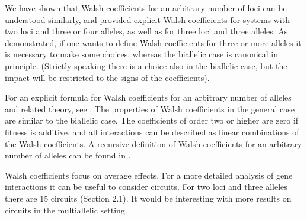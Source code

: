 \documentclass[12pt]{amsart}
\theoremstyle{plain}
\theoremstyle{definition}
\begin{document}
We have shown that Walsh-coefficients for an arbitrary number of loci
can be understood similarly, and provided explicit Walsh coefficients
for systems with two loci and three or four alleles, as well as for three loci
and three alleles. 
As demonstrated,  if one wants to define Walsh coefficients for  three or more alleles 
it is necessary to make some choices, whereas the biallelic case 
is canonical in principle. (Strictly speaking 
there is a choice also in the biallelic case, but
the impact will be restricted to the signs 
of the coefficients).


For an explicit  formula for 
Walsh coefficients for an arbitrary number
of alleles and related theory, see  \citet{gs}.
The properties of Walsh coefficients
in the general case are similar to the
biallelic case. The coefficients 
of order two or higher are zero if
fitness is additive, and all interactions
can be described as linear combinations
of the Walsh coefficients.
A recursive definition of Walsh coefficients
 for an arbitrary number of
 alleles can be found in \citep{mps}.


Walsh coefficients focus on average effects.
For a more detailed analysis of gene
interactions it can be useful to consider circuits.
For two loci and three alleles there are 15 circuits
(Section 2.1). It would be interesting with 
more results on circuits in the multiallelic setting.









 
\end{document}
